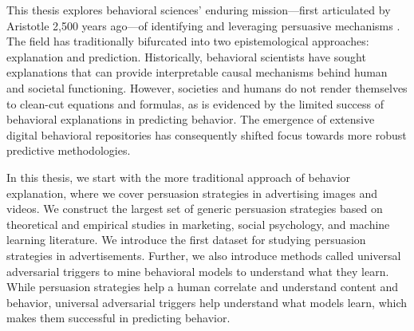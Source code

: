This thesis explores behavioral sciences' enduring mission—first articulated by Aristotle 2,500 years ago—of identifying and leveraging persuasive mechanisms \cite{rapp2002aristotle}. The field has traditionally bifurcated into two epistemological approaches: explanation and prediction. Historically, behavioral scientists have sought explanations that can provide interpretable causal mechanisms behind human and societal functioning. However, societies and humans do not render themselves to clean-cut equations and formulas, as is evidenced by the limited success of behavioral explanations in predicting behavior. The emergence of extensive digital behavioral repositories has consequently shifted focus towards more robust predictive methodologies.





In this thesis, we start with the more traditional approach of behavior explanation, where we cover persuasion strategies in advertising images and videos. We construct the largest set of generic persuasion strategies based on theoretical and empirical studies in marketing, social psychology, and machine learning literature. We introduce the first dataset for studying persuasion strategies in advertisements. Further, we also introduce methods called universal adversarial triggers to mine behavioral models to understand what they learn. While persuasion strategies help a human correlate and understand content and behavior, universal adversarial triggers help understand what models learn, which makes them successful in predicting behavior.

